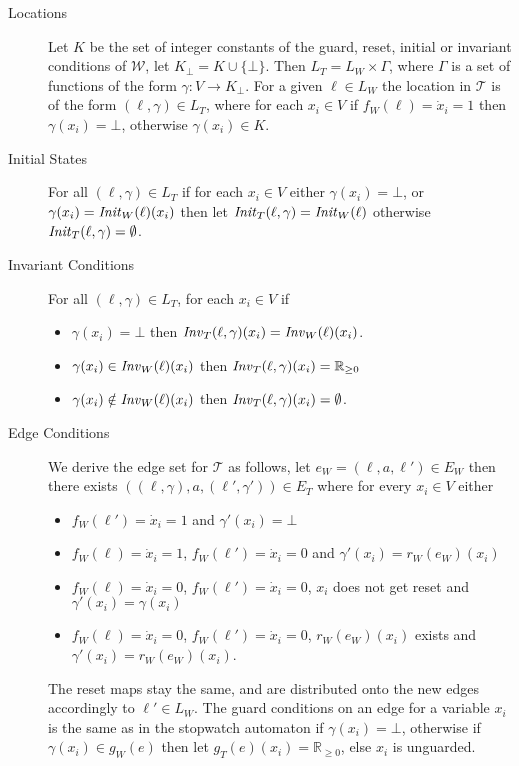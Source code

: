 \begin{description}
\item[Locations] Let $K$ be the set of integer constants of the guard, reset, initial or invariant  conditions of $\mathcal{W}$, let $K_{\bot}=K\cup\{\bot\}$. Then $L_{T}=L_{W}\times \Gamma$, where $\Gamma$ is a set of functions of the form $\gamma:V\rightarrow K_{\bot}$. For a given
$\ell\in L_{W}$ the location in $\mathcal{T}$ is of the form $(\ell,\gamma)\in L_{T}$, where for each $x_{i}\in V$ if $f_{W}(\ell)=\dot{x}_{i}=1$ then $\gamma(x_{i}) = \bot$, otherwise
$\gamma(x_{i})\in K$.
\item[Initial States] For all $(\ell,\gamma)\in L_{T}$ if for each $x_{i}\in V$ either $\gamma(x_{i}) = \bot$, or $\gamma(x_{i}) = \mathit{Init}_{W}(\ell)(x_{i})$ then let $\mathit{Init}_{T}(\ell,\gamma) = \mathit{Init}_{W}(\ell)$ otherwise $\mathit{Init}_{T}(\ell,\gamma)=\emptyset$.
\item[Invariant Conditions] For all $(\ell,\gamma)\in L_{T}$, for each $x_{i}\in V$ if
    \begin{itemize}
        \item $\gamma(x_{i}) = \bot$ then $\mathit{Inv}_{T}(\ell,\gamma)(x_{i}) = \mathit{Inv}_{W}(\ell)(x_{i})$.
        \item $\gamma(x_{i}) \in \mathit{Inv}_{W}(\ell)(x_{i})$ then $\mathit{Inv}_{T}(\ell,\gamma)(x_{i})=\mathbb{R}_{\geq 0}$
        \item $\gamma(x_{i}) \notin \mathit{Inv}_{W}(\ell)(x_{i})$ then $\mathit{Inv}_{T}(\ell,\gamma)(x_{i})=\emptyset$.
    \end{itemize}
\item[Edge Conditions] We derive the edge set for $\mathcal{T}$ as follows, let $e_{W}=(\ell,a,\ell')\in E_{W}$ then there exists $((\ell,\gamma), a, (\ell',\gamma'))\in E_{T}$ where for every $x_{i}\in V$ either
    \begin{itemize}
        \item $f_{W}(\ell')=\dot{x}_{i} = 1$ and $\gamma'(x_{i}) = \bot$
        \item $f_{W}(\ell)=\dot{x}_{i}=1$, $f_{W}(\ell')=\dot{x}_{i}=0$ and $\gamma'(x_{i})=r_{W}(e_{W})(x_{i})$
        \item $f_{W}(\ell)=\dot{x}_{i}=0$, $f_{W}(\ell')=\dot{x}_{i}=0$, $x_{i}$ does not get reset and $\gamma'(x_{i})=\gamma(x_{i})$
        \item $f_{W}(\ell)=\dot{x}_{i}=0$, $f_{W}(\ell')=\dot{x}_{i}=0$, $r_{W}(e_{W})(x_{i})$ exists and $\gamma'(x_{i})=r_{W}(e_{W})(x_{i})$.
    \end{itemize}
The reset maps stay the same, and are distributed onto the new edges accordingly to $\ell'\in L_{W}$. The guard conditions on an edge for a variable $x_{i}$ is the same as in the stopwatch automaton if $\gamma(x_{i})=\bot$, otherwise if $\gamma(x_{i})\in g_{W}(e)$ then let $g_{T}(e)(x_{i})=\mathbb{R}_{\geq 0}$, else $x_{i}$ is unguarded.

\end{description}
